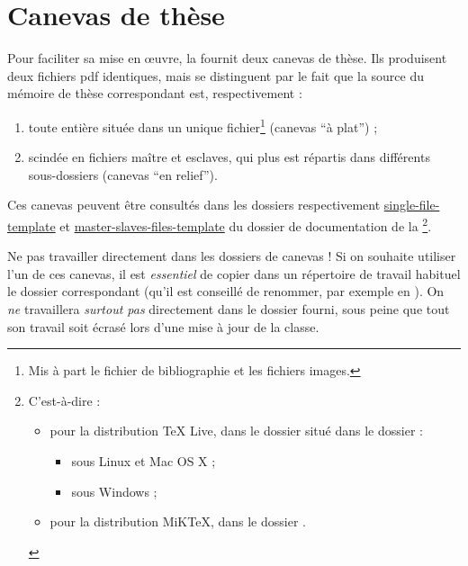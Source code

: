 \chapter{Canevas de thèse}\label{cha:canevas}

Pour faciliter sa mise en œuvre, la \yatcl fournit deux canevas de thèse. Ils
produisent deux fichiers \gls{pdf} identiques, mais se distinguent par le fait
que la source  du mémoire de thèse correspondant est,
respectivement :
\begin{enumerate}
\item toute entière située dans un unique fichier\footnote{Mis à part le
    fichier de bibliographie et les fichiers images.} (canevas \enquote{à
    plat}) ;
\item scindée en fichiers maître et esclaves, qui plus est répartis dans
  différents sous-dossiers (canevas \enquote{en relief}).
\end{enumerate}

Ces canevas peuvent être consultés dans les dossiers respectivement
\href{single-file-template/.}{single-file-template} et
\href{master-slaves-files-template/.}{master-slaves-files-template} du dossier
de documentation de la \yatcl{}\footnote{C'est-à-dire :
  \begin{itemize}
  \item pour la distribution \TeX{} Live, dans le dossier
    \tldistdirectory\jobdocdirectory{} situé dans le dossier :
    \begin{itemize}
    \item \unixtldirectory{} sous Linux et Mac OS X ;
    \item \wintldirectory{} sous Windows ;
    \end{itemize}
  \item pour la distribution MiK\TeX, dans le dossier \miktexdistdirectory.
  \end{itemize}
}.

\begin{dbwarning}{Ne pas travailler directement dans les dossiers de canevas !}{}
  Si on souhaite utiliser l'un de ces canevas, il est \emph{essentiel} de
  copier dans un répertoire de travail habituel le dossier correspondant (qu'il
  est conseillé de renommer, par exemple en ). On \emph{ne}
  travaillera \emph{surtout pas} directement dans le dossier fourni, sous peine
  que tout son travail soit écrasé lors d'une mise à jour de la classe.
\end{dbwarning}

